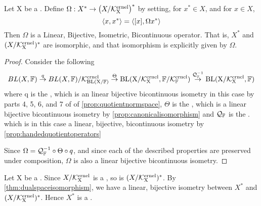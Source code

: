 \begin{thm}
\label{thm:dualspaceisomorphism}
    Let X be a 
    \SeminormedSpace.
    Define $\Omega:X^* \to \left( X/\bf\mathcal{K}\rm^{ernel}_X\right)^*$
    by setting, for $x^* \in X$, 
    and for $x \in X$, 
    \begin{equation}
        \left\langle x, x^* \right\rangle = \left\langle [x], \Omega x^* \right\rangle
    \end{equation}
    Then $\Omega$ is a 
    Linear, 
    Bijective, 
    Isometric, 
    Bicontinuous operator. 
    That is, $X^*$ and $(X/\bf\mathcal{K}\rm^{ernel}_X)^*$ are 
    isomorphic, and that isomorphism is explicitly
    given by $\Omega$. 
    \begin{proof}
        Consider the following
        \begin{equation}
            BL(X,\mathbb{F}) \overset{q}{\to} BL(X,\mathbb{F})/\bf\mathcal{K}\rm^{ernel}_{BL(X/\mathbb{F})} \overset{\Theta}{\to} BL(X/\bf\mathcal{K}\rm^{ernel}_X, \mathbb{F}/\bf\mathcal{K}\rm^{ernel}_{\mathbb{F}}) \overset{\mathcal{Q}_{\mathbb{F}}^{-1}}{\to} BL(X/\bf\mathcal{K}\rm^{ernel}_X,\mathbb{F})
        \end{equation}
        where
        q is the \QuotientMap, 
        which is an linear bijective bicontinuous isometry in this case
        by parts 4, 5, 6, and 7 of 
        of \ref{prop:quotientnormspace}, 
        $\Theta$ is the \CanonicalIso, 
        which is a linear bijective bicontinuous isometry by 
        \ref{prop:canonicalisomorphism}
        and $\mathcal{Q}_{\mathbb{F}}$ is the \CodomainQuotientMap.
        which is in this case a linear, bijective, bicontinuous isometry
        by \ref{prop:handedquotientoperators}


        Since $\Omega=\mathcal{Q}_{\mathbb{F}}^{-1} \circ \Theta \circ q$, 
        and since each of the described properties
        are preserved under composition, 
        $\Omega$ is also a 
        linear bijective bicontinuous isometry. 
    \end{proof}
\end{thm}

\begin{rmk}
\label{rmk:dualspaceisnormedspace}
	Let X be a 
	\SeminormedSpace.
	Since $X/\bf\mathcal{K}\rm^{ernel}_X$
	is a \NormedSpace, 
	so is $(X/\bf\mathcal{K}\rm^{ernel}_X)^*$. 
	By 
	\ref{thm:dualspaceisomorphism}, 
	we have a
	linear, bijective isometry
	between $X^*$
	and 
	$(X/\bf\mathcal{K}\rm^{ernel}_X)^*$. 
	Hence $X^*$ is a \NormedSpace. 
\end{rmk}
